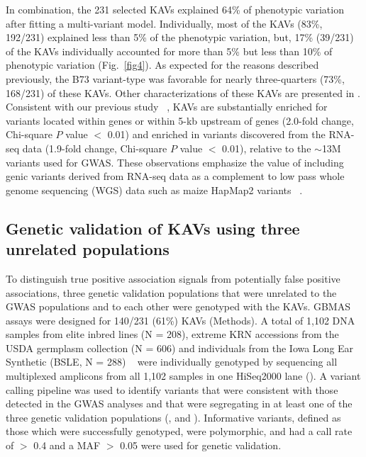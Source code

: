 \documentclass[10pt,letterpaper]{article}
\begin{document}
In combination, the 231 selected KAVs explained 64\% of phenotypic variation after fitting a multi-variant model. Individually, most of the KAVs (83\%, 192/231) explained less than 5\% of the phenotypic variation, but, 17\% (39/231) of the KAVs individually accounted for more than 5\% but less than 10\% of phenotypic variation (Fig.~\ref{fig4}). As expected for the reasons described previously, the B73 variant-type was favorable for nearly three-quarters (73\%, 168/231) of these KAVs. Other characterizations of these KAVs are presented in .  Consistent with our previous study ~\cite{Li2012}, KAVs are substantially enriched for variants located within genes or within 5-kb upstream of genes (2.0-fold change, Chi-square $P$ value $<$ 0.01) and enriched in variants discovered from the RNA-seq data (1.9-fold change, Chi-square $P$ value $<$ 0.01), relative to the $\sim$13M variants used for GWAS. These observations emphasize the value of including genic variants derived from RNA-seq data as a complement to low pass whole genome sequencing (WGS) data such as maize HapMap2 variants ~\cite{Chia2012}.

\subsection*{Genetic validation of KAVs using three unrelated populations}
To distinguish true positive association signals from potentially false positive associations, three genetic validation populations that were unrelated to the GWAS populations and to each other were genotyped with the KAVs. GBMAS assays were designed for 140/231 (61\%) KAVs (Methods). A total of 1,102 DNA samples from elite inbred lines (N = 208), extreme KRN accessions from the USDA germplasm collection (N = 606) and individuals from the Iowa Long Ear Synthetic (BSLE, N = 288) ~\cite{Hallauer2005} were individually genotyped by sequencing all multiplexed amplicons from all 1,102 samples in one HiSeq2000 lane (). A variant calling pipeline was used to identify variants that were consistent with those detected in the GWAS analyses and that were segregating in at least one of the three genetic validation populations (,  and ). Informative variants, defined as those which were successfully genotyped, were polymorphic, and had a call rate of  $>$ 0.4 and a MAF $>$ 0.05 were used for genetic validation.
\end{document}
